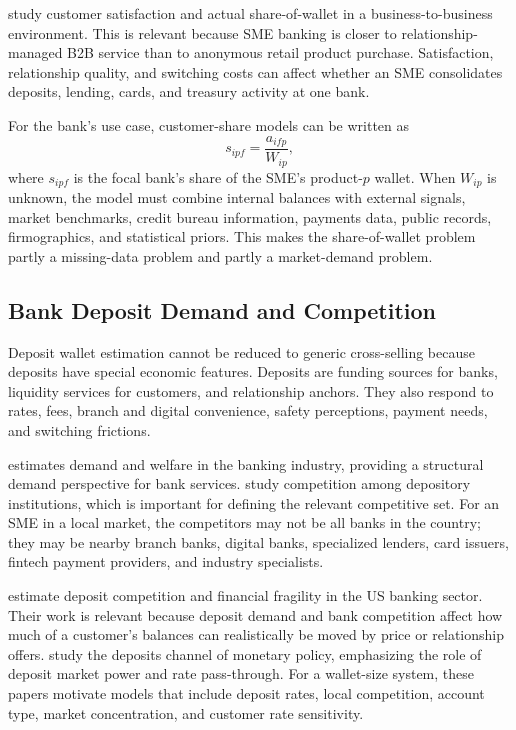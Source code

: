 \documentclass[11pt]{article}
\begin{document}
\citet{keiningham2003sow} study customer satisfaction and actual share-of-wallet
in a business-to-business environment. This is relevant because SME banking is
closer to relationship-managed B2B service than to anonymous retail product
purchase. Satisfaction, relationship quality, and switching costs can affect
whether an SME consolidates deposits, lending, cards, and treasury activity at
one bank.

For the bank's use case, customer-share models can be written as
\[
  s_{ipf} = \frac{a_{ifp}}{W_{ip}},
\]
where $s_{ipf}$ is the focal bank's share of the SME's product-$p$ wallet.
When $W_{ip}$ is unknown, the model must combine internal balances with external
signals, market benchmarks, credit bureau information, payments data, public
records, firmographics, and statistical priors. This makes the share-of-wallet
problem partly a missing-data problem and partly a market-demand problem.

\subsection{Bank Deposit Demand and Competition}

Deposit wallet estimation cannot be reduced to generic cross-selling because
deposits have special economic features. Deposits are funding sources for banks,
liquidity services for customers, and relationship anchors. They also respond to
rates, fees, branch and digital convenience, safety perceptions, payment needs,
and switching frictions.

\citet{dick2008demand} estimates demand and welfare in the banking industry,
providing a structural demand perspective for bank services. \citet{adams2007who}
study competition among depository institutions, which is important for defining
the relevant competitive set. For an SME in a local market, the competitors may
not be all banks in the country; they may be nearby branch banks, digital banks,
specialized lenders, card issuers, fintech payment providers, and industry
specialists.

\citet{egan2017deposit} estimate deposit competition and financial fragility in
the US banking sector. Their work is relevant because deposit demand and bank
competition affect how much of a customer's balances can realistically be moved
by price or relationship offers. \citet{drechsler2017deposits} study the
deposits channel of monetary policy, emphasizing the role of deposit market
power and rate pass-through. For a wallet-size system, these papers motivate
models that include deposit rates, local competition, account type, market
concentration, and customer rate sensitivity.
\end{document}
